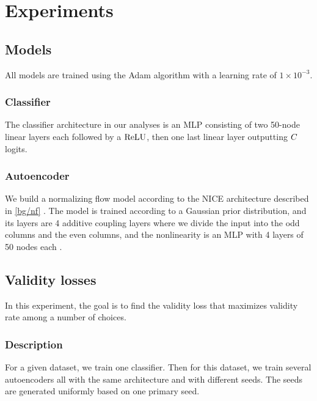\documentclass[../main.tex]{subfiles}
\begin{document}
\chapter{Experiments}

\section{Models}

All models are trained using the Adam algorithm \cite{kingmaAdam2014} with a learning rate of $1 \times 10^{-3}$.

\subsection{Classifier}

The classifier architecture in our analyses is an MLP consisting of two 50-node linear layers each followed by a $\text{ReLU}$, then one last linear layer outputting $C$ logits.

\subsection{Autoencoder}

We build a normalizing flow model according to the NICE architecture described in \autoref{bg/nf} \cite{dinhNICE2015}.
The model is trained according to a Gaussian prior distribution, and its layers are 4 additive coupling layers where we divide the input into the odd columns and the even columns, and the nonlinearity is an MLP with 4 layers of 50 nodes each .

\section{Validity losses}

In this experiment, the goal is to find the validity loss that maximizes validity rate among a number of choices.

\subsection{Description}
\label{validity_losses/description}

For a given dataset, we train one classifier.
Then for this dataset, we train several autoencoders all with the same architecture and with different seeds.
The seeds are generated uniformly based on one primary seed.
\end{document}
